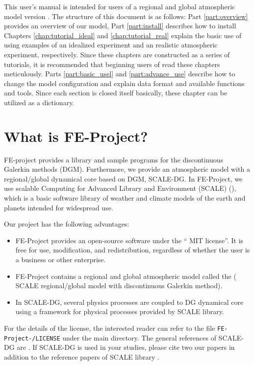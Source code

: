 
This user's manual is intended for users
of a regional and global atmospheric model \scaledg version \version.
The structure of this document is as follows:
Part \ref{part:overview} provides an overview of our model,
Part \ref{part:install} describes how to install \scaledg
Chapters \ref{chap:tutorial_ideal} and \ref{chap:tutorial_real}
explain the basic use of \scaledg
using examples of an idealized experiment and an realistic atmospheric experiment, respectively.
Since these chapters are constructed as a series of tutorials, 
it is recommended that beginning users of \scaledg read these chapters meticulously.
Parts \ref{part:basic_usel} and \ref{part:advance_use}
describe how to change the model configuration 
and explain data format and available functions and tools.
Since each section is closed itself basically, 
these chapter can be utilized as a dictionary.



\section{What is FE-Project?} \label{subsec:scale_feature}

FE-project provides a library and sample programs for the discontinuous Galerkin methods
(DGM). Furthermore, we provide an atmospheric model with a regional/global dynamical
core based on DGM, SCALE-DG. In FE-Project, we use scalable Computing for Advanced
Library and Environment (SCALE) (\scaleweb), which is a basic software library of weather and
climate models of the earth and planets intended for widespread use.


Our project has the following advantages:
\begin{itemize}
\item 
FE-Project provides an open-source software under the `` MIT license''. It is free for use, modification, and redistribution, regardless of whether the user is a business or other enterprise.
\item 
FE-Project contains a regional and global atmospheric model called the \scaledg ( SCALE regional/global model with discontinuous Galerkin method).
\item 
In SCALE-DG, several physics processes are coupled to DG dynamical core using a framework for physical processes provided by SCALE library.
\end{itemize}
For the details of the license, the interested reader can refer to the file \texttt{FE-Project-\version/LICENSE} under the main directory. 
The general references of SCALE-DG are \cite{KT2023NumAccuracyDG,KT2025SCALEDG}. 
If SCALE-DG is used in your studies, 
please cite two our papers in addition to the reference papers of SCALE library \citep{nishizawa2015influence,sato2015impacts}. 


